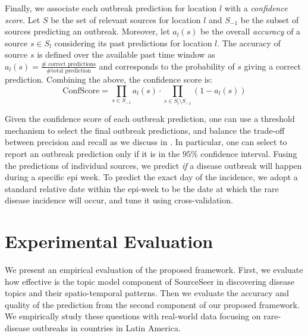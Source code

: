 \documentclass[twoside,leqno,twocolumn]{article}
\newcommand{\fullmodel}{{{\sf SourceSeer}}\xspace}
\begin{document}
Finally, we associate each outbreak prediction for location $l$ with a {\em confidence score}. Let $S$ be the set of relevant sources for location $l$ and $S_{-1}$ be the subset of sources predicting an outbreak. Moreover, let $a_l(s)$ be the overall {\em accuracy} of a source $s \in S_l$ considering its past predictions for location $l$. The accuracy of source $s$ is defined over the available past time window as $a_l(s) = \frac{\#\mbox{ correct predictions}}{\#\mbox{total prediction}}$ and corresponds to the probability of $s$ giving a correct prediction. Combining the above, the confidence score is: 
{\small \begin{equation}
\textrm{ConfScore} = \prod_{s \in S_{-1}}a_l(s) \cdot \prod_{s \in S_l \setminus S_{-1}} (1 - a_l(s))
\label{eq:conf}
\end{equation}}
\vspace{-10pt}

\noindent Given the confidence score of each outbreak prediction, one can use a threshold mechanism to select the final outbreak predictions, and balance the trade-off between precision and recall as we discuss in . In particular, one can select to report an outbreak prediction only if it is in the $95\%$ confidence interval. Fusing the predictions of individual sources, we predict  {\em if} a disease outbreak will happen during a specific epi week. To predict the exact day of the incidence, we adopt a standard relative date within the epi-week to be the date at which the rare disease incidence will occur, and tune it using cross-validation. 

\vspace{-10pt}
\section{Experimental Evaluation}
\label{sec:exp}
We present an empirical evaluation of the proposed framework. First, we evaluate how effective is the topic model component of \fullmodel in discovering disease topics and their spatio-temporal patterns. Then we evaluate the accuracy and quality of the prediction from the second component of our proposed framework. We empirically study these questions with real-world data focusing on rare-disease outbreaks in countries in Latin America.

\vspace{-10pt}
\end{document}
